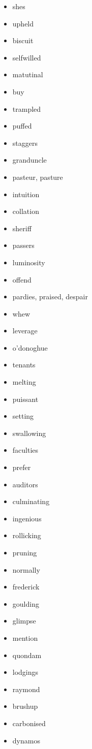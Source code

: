 \documentclass{article}
\begin{document}
\begin{itemize}
    \item shes
    \item upheld
    \item biscuit
    \item selfwilled
    \item matutinal
    \item buy
    \item trampled
    \item puffed
    \item staggers
    \item granduncle
    \item pasteur, pasture
    \item intuition
    \item collation
    \item sheriff
    \item passers
    \item luminosity
    \item offend
    \item pardies, praised, despair
    \item whew
    \item leverage
    \item o'donoghue
    \item tenants
    \item melting
    \item puissant
    \item setting
    \item swallowing
    \item faculties
    \item prefer
    \item auditors
    \item culminating
    \item ingenious
    \item rollicking
    \item pruning
    \item normally
    \item frederick
    \item goulding
    \item glimpse
    \item mention
    \item quondam
    \item lodgings
    \item raymond
    \item brushup
    \item carbonised
    \item dynamos

\end{itemize}
\end{document}
